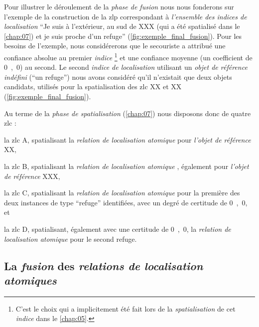 Pour illustrer le déroulement de la \emph{phase de fusion} nous nous
fonderons sur l'exemple de la construction de la \ac{zlp}
correspondant à \emph{l'ensemble des indices de localisation}
\enquote{Je suis à l'extérieur, au sud de XXX (qui a été spatialisé
  dans le \autoref{chap:07}) et je suis proche d'un refuge}
(\autoref{fig:exemple_final_fusion}). Pour les besoins de l'exemple,
nous considérerons que le secouriste a attribué une confiance absolue
au premier \emph{indice} \footnote{C'est le choix qui a implicitement
  été fait lors de la \emph{spatialisation} de cet \emph{indice} dans
  le \autoref{chap:05}.} et une confiance moyenne (\ie un coefficient
de \si{0,0}) au second. Le second \emph{indice de localisation}
utilisant un \emph{objet de référence indéfini} (\eg \enquote{un
  refuge}) nous avons considéré qu'il n'existait que deux objets
candidats, utilisés pour la spatialisation des \ac{zlc} XX et XX
(\autoref{fig:exemple_final_fusion}).

Au terme de la \emph{phase de spatialisation} (\autoref{chap:07}) nous
disposons donc de quatre \ac{zlc} :
% 
\begin{enumerate*}[label=(\arabic*)]
\item la \ac{zlc} \textcolor{RdBu-9-1}{\textsf{A}}, spatialisant la \emph{relation de localisation
    atomique}  pour \emph{l'objet de référence}
  XX,
\item la \ac{zlc} \textcolor{RdBu-9-3}{\textsf{B}}, spatialisant la \emph{relation de localisation
    atomique} , également pour \emph{l'objet de
    référence} XXX,
\item la \ac{zlc} \textcolor{RdBu-9-7}{\textsf{C}}, spatialisant la \emph{relation de localisation
    atomique}  pour la première des deux instances de
  type \enquote{refuge} identifiées, avec un degré de certitude de \si{0,0}, et
\item la \ac{zlc} \textcolor{RdBu-9-9}{\textsf{D}}, spatialisant,
  également avec une certitude de \si{0,0}, la \emph{relation de
    localisation atomique}  pour le second refuge.
\end{enumerate*}
% 

\subsection{La \emph{fusion} des \emph{relations de localisation
    atomiques}}

